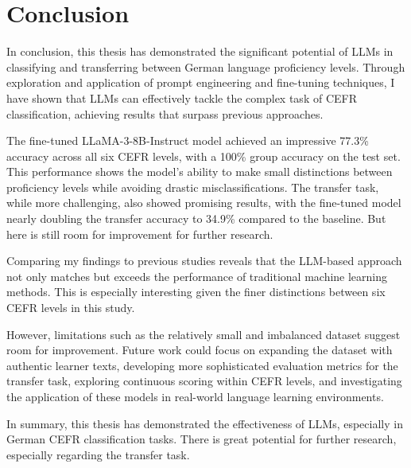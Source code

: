 \chapter{Conclusion}
\label{ch:conclusion}

In conclusion, this thesis has demonstrated the significant potential of LLMs in classifying and transferring between German language proficiency levels. Through exploration and application of prompt engineering and fine-tuning techniques, I have shown that LLMs can effectively tackle the complex task of CEFR classification, achieving results that surpass previous approaches.

The fine-tuned LLaMA-3-8B-Instruct model achieved an impressive 77.3\% accuracy across all six CEFR levels, with a 100\% group accuracy on the test set. This performance shows the model's ability to make small distinctions between proficiency levels while avoiding drastic misclassifications. The transfer task, while more challenging, also showed promising results, with the fine-tuned model nearly doubling the transfer accuracy to 34.9\% compared to the baseline. But here is still room for improvement for further research.

Comparing my findings to previous studies reveals that the LLM-based approach not only matches but exceeds the performance of traditional machine learning methods. This is especially interesting given the finer distinctions between six CEFR levels in this study.

However, limitations such as the relatively small and imbalanced dataset suggest room for improvement. Future work could focus on expanding the dataset with authentic learner texts, developing more sophisticated evaluation metrics for the transfer task, exploring continuous scoring within CEFR levels, and investigating the application of these models in real-world language learning environments.

In summary, this thesis has demonstrated the effectiveness of LLMs, especially in German CEFR classification tasks. There is great potential for further research, especially regarding the transfer task.


